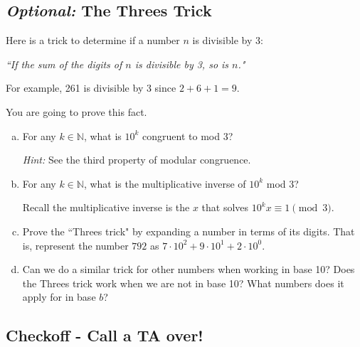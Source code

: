 \documentclass[12pt,letterpaper]{article}
\newcommand\N{\mathbb N}
\newif\ifsol
\newcommand{\solu}[2]{ \begin{mdframed} \ifsol #2 \else \vspace{#1} \fi \end{mdframed} }
\begin{document}
\pagebreak

		\subsection*{\textit{Optional: }The Threes Trick}

		Here is a trick to determine if a number $n$ is divisible by 3:
		
		\textit{``If the sum of the digits of $n$ is divisible by 3, so is $n$."}

		For example, 261 is divisible by 3 since $2+6+1 = 9$.

		You are going to prove this fact.

		\begin{enumerate}[a.]
			\item For any $k \in \N$, what is $10^k$ congruent to mod 3?
			
			\textit{Hint:} See the third property of modular congruence.

			\solu{1cm}{
			$10 \equiv 1 \pmod{3}$, and if we raise both sides to the $k$ congruence still holds $\implies 10^k \equiv 1^k \pmod{3} \implies 10^k \equiv 1 \pmod{3}$
			}

			\item For any $k \in \N$, what is the multiplicative inverse of $10^k$ mod 3?

			Recall the multiplicative inverse is the $x$ that solves $10^k x\equiv 1 \pmod 3$.

			\solu{1cm}{1}

			\item Prove the ``Threes trick" by expanding a number in terms of its digits. That is, represent the number $792$ as $7 \cdot 10^2 + 9 \cdot 10^1 + 2 \cdot 10^0$.
			
			\solu{4cm}{
			Consider the integer $a_m \cdot 10^m + a_{m-1} \cdot 10^{m-1} + ... + a_1 \cdot 10^1 + a_0 \cdot 10^0$.
			As for any positive integer $k$, $10^k \equiv 1 \pmod{3}$, by what was proven in warmup $a_k \cdot 10^k \equiv a_k$. \\
			Adding it all up as we also proved was possible in the warmup, $a_m \cdot 10^m + a_{m-1} \cdot 10^{m-1} + ... + a_1 \cdot 10^1 + a_0 \cdot 10^0 \equiv a_m + a_{m-1}+ ... + a_1 + a_0 \pmod{3}$. So, if the sum of the digits is divisible by 3, aka congruent to 0 $\pmod 3$, so will the full number.}


			\item Can we do a similar trick for other numbers when working in base 10? Does the Threes trick work when we are not in base 10? What numbers does it apply for in base $b$?
			
			\solu{1cm}{
			The trick works for $a$ in base $b$ when $b \equiv 1 \pmod{a}$.}
			
		\end{enumerate}

   \subsection*{Checkoff - Call a TA over!}
\end{document}
